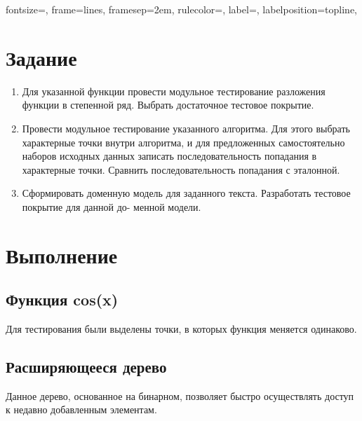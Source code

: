 
\isonefalse
\def \labnum {1}
\def \labsubj {Тестирование программного обеспечения}
\def \labauthor {Айтуганов Д. А. \\ Чебыкин И. Б.}
\def \labgroup {P3301}
\isinspfalse
\def \labinsp {}
\def \labname {Вариант: 756}
\isnametrue

\usepackage{graphicx}
\usepackage{verbatim}
\usepackage[dvipsnames]{xcolor}

\usepackage{fancyvrb}

 {
 fontsize=\scriptsize,
 frame=lines,  %
 framesep=2em, %
 rulecolor=\color{Gray},
 label=,
 labelposition=topline,
}



\section{Задание}
\begin{enumerate}
\item Для указанной функции провести модульное тестирование разложения функции в степенной ряд. Выбрать достаточное тестовое покрытие.

\item Провести модульное тестирование указанного алгоритма. Для этого выбрать характерные точки внутри алгоритма, и для предложенных самостоятельно наборов исходных данных записать последовательность
попадания в характерные точки. Сравнить последовательность попадания с эталонной.
\item Сформировать доменную модель для заданного текста. Разработать тестовое покрытие для данной до-
менной модели.
\end{enumerate}

\section{Выполнение}

\subsection{Функция cos(x)}
Для тестирования были выделены точки, в которых функция меняется одинаково.

\subsection{Расширяющееся дерево}
Данное дерево, основанное на бинарном, позволяет быстро осуществлять доступ
к недавно добавленным элементам.

